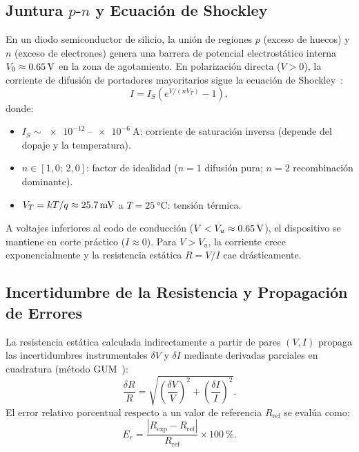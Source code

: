 \subsection{Juntura \texorpdfstring{$p$-$n$}{p-n} y Ecuación de Shockley}

En un diodo semiconductor de silicio, la unión de regiones $p$ (exceso de huecos) y $n$ (exceso de electrones) genera una barrera de potencial electrostático interna $V_0 \approx \qty{0{,}65}{\volt}$ en la zona de agotamiento. En polarización directa ($V > 0$), la corriente de difusión de portadores mayoritarios sigue la ecuación de Shockley~\cite{boylestad}:
\begin{equation}
    \boxed{I = I_S\left(e^{V/(nV_T)} - 1\right),}
    \label{eq:shockley}
\end{equation}
donde:
\begin{itemize}
    \item $I_S \sim \qty{e-12}{}$--$\qty{e-6}{\ampere}$: corriente de saturación inversa (depende del dopaje y la temperatura).
    \item $n \in [1{,}0;\,2{,}0]$: factor de idealidad ($n = 1$ difusión pura; $n = 2$ recombinación dominante).
    \item $V_T = kT/q \approx \qty{25{,}7}{\milli\volt}$ a $T = \qty{25}{\celsius}$: tensión térmica.
\end{itemize}

A voltajes inferiores al codo de conducción ($V < V_u \approx \qty{0{,}65}{\volt}$), el dispositivo se mantiene en corte práctico ($I \approx 0$). Para $V > V_u$, la corriente crece exponencialmente y la resistencia estática $R = V/I$ cae drásticamente.

\subsection{Incertidumbre de la Resistencia y Propagación de Errores}

La resistencia estática calculada indirectamente a partir de pares $(V, I)$ propaga las incertidumbres instrumentales $\delta V$ y $\delta I$ mediante derivadas parciales en cuadratura (método GUM~\cite{gum, taylor}):
\begin{equation}
    \frac{\delta R}{R} = \sqrt{\left(\frac{\delta V}{V}\right)^2 + \left(\frac{\delta I}{I}\right)^2}.
    \label{eq:prop_errores_R}
\end{equation}
El error relativo porcentual respecto a un valor de referencia $R_{\text{ref}}$ se evalúa como:
\begin{equation}
    E_r = \frac{|R_{\text{exp}} - R_{\text{ref}}|}{R_{\text{ref}}} \times \qty{100}{\percent}.
    \label{eq:error_relativo}
\end{equation}